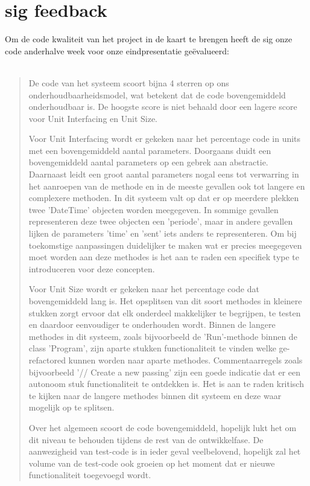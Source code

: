 \section{\acs{sig} feedback}
Om de code kwaliteit van het project in de kaart te brengen heeft de \ac{sig} onze code anderhalve week voor onze eindpresentatie geëvalueerd: 
\\\\
\begin{quotation}
De code van het systeem scoort bijna 4 sterren op ons onderhoudbaarheidsmodel, wat betekent dat de code bovengemiddeld onderhoudbaar is. De hoogste score is niet behaald door een lagere score voor Unit Interfacing en Unit Size.

Voor Unit Interfacing wordt er gekeken naar het percentage code in units met een bovengemiddeld aantal parameters. Doorgaans duidt een bovengemiddeld aantal parameters op een gebrek aan abstractie. Daarnaast leidt een groot aantal parameters nogal eens tot verwarring in het aanroepen van de methode en in de meeste gevallen ook tot langere en complexere methoden. In dit systeem valt op dat er op meerdere plekken twee 'DateTime' objecten worden meegegeven. In sommige gevallen representeren deze twee objecten een 'periode', maar in andere gevallen lijken de parameters 'time' en 'sent' iets anders te representeren. Om bij toekomstige aanpassingen duidelijker te maken wat er precies meegegeven moet worden aan deze methodes is het aan te raden een specifiek type te introduceren voor deze concepten.

Voor Unit Size wordt er gekeken naar het percentage code dat bovengemiddeld lang is. Het opsplitsen van dit soort methodes in kleinere stukken zorgt ervoor dat elk onderdeel makkelijker te begrijpen, te testen en daardoor eenvoudiger te onderhouden wordt. Binnen de langere methodes in dit systeem, zoals bijvoorbeeld de 'Run'-methode binnen de class 'Program', zijn aparte stukken functionaliteit te vinden welke ge-refactored kunnen worden naar aparte methodes. Commentaarregels zoals bijvoorbeeld '// Create a new passing' zijn een goede indicatie dat er een autonoom stuk functionaliteit te ontdekken is. Het is aan te raden kritisch te kijken naar de langere methodes binnen dit systeem en deze waar mogelijk op te splitsen.

Over het algemeen scoort de code bovengemiddeld, hopelijk lukt het om dit niveau te behouden tijdens de rest van de ontwikkelfase. De aanwezigheid van test-code is in ieder geval veelbelovend, hopelijk zal het volume van de test-code ook groeien op het moment dat er nieuwe functionaliteit toegevoegd wordt. 
\end{quotation}

